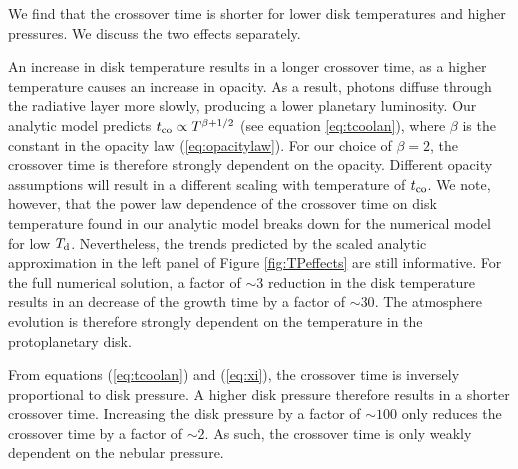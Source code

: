 \documentclass[apj]{emulateapj}
\newcommand{\di}{_{\rm d}}
\newcommand{\cb}{_{\rm RCB}}
\begin{document}
We find that the crossover time is shorter for lower disk temperatures and higher pressures. We discuss the two effects separately.

An increase in disk temperature results in a longer crossover time, as a higher temperature causes an increase in opacity. As a result, photons diffuse through the radiative layer more slowly, producing a lower planetary luminosity. Our analytic model predicts $t_{\rm{co}} \propto T^{\beta+ 1/2}$ (see equation \ref{eq:tcoolan}), where $\beta$ is the constant in the opacity law (\ref{eq:opacitylaw}). For our choice of $\beta=2$, the crossover time is therefore strongly dependent on the opacity. Different opacity assumptions will result in a different scaling with temperature of $t_{\rm{co}}$.  We note, however, that the power law dependence of the crossover time on disk temperature found in our analytic model breaks down for the numerical model for low $T\di$. Nevertheless, the trends predicted by the scaled analytic approximation in the left panel of Figure \ref{fig:TPeffects} are still informative. For the full numerical solution, a factor of $\sim 3$ reduction in the disk temperature results in an decrease of the growth time by a factor of $\sim 30$. The atmosphere evolution is therefore strongly dependent on the temperature in the protoplanetary disk.

From equations (\ref{eq:tcoolan}) and (\ref{eq:xi}), the crossover time is inversely proportional to disk pressure. A higher disk pressure therefore results in a shorter crossover time. Increasing the disk pressure by a factor of $\sim 100$ only reduces the crossover time by a factor of $\sim 2$. As such, the crossover time is only weakly dependent on the nebular pressure.



\end{document}
